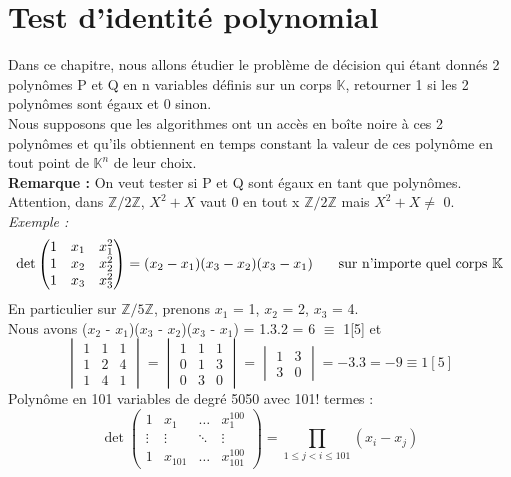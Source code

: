\documentclass[12pt,a4paper]{article}
\newcommand\tab[1][0.65cm]{\hspace*{#1}}
\begin{document}
\section{Test d'identité polynomial}
Dans ce chapitre, nous allons étudier le problème de décision qui étant donnés 2 polynômes P et Q en n variables définis sur un corps $\mathbb{K}$, retourner 1 si les 2 polynômes sont égaux et 0 sinon.\\
Nous supposons que les algorithmes ont un accès en boîte noire à ces 2 polynômes et qu'ils obtiennent en temps constant la valeur de ces polynôme en tout point de $\mathbb{K}^n$ de leur choix.\\
\textbf{Remarque :} On veut tester si P et Q sont égaux en tant que polynômes. Attention, dans $\mathbb{Z}/2\mathbb{Z}$, $X^2+ X$ vaut 0 en tout x $\mathbb{Z}/2\mathbb{Z}$ mais $X^2 + X \neq$ 0.\\
\textit{Exemple :}\\
\begin{equation*}
\det
\begin{pmatrix}
1 & x_1 & x^2_1 \\
1 & x_2 & x_2^2 \\
1 & x_3 & x^2_3
\end{pmatrix} = (x_2 - x_1)(x_3 - x_2)(x_3 - x_1) \text{\tab sur n'importe quel corps $\mathbb{K}$}
\end{equation*}
En particulier sur $\mathbb{Z}/5\mathbb{Z}$, prenons $x_1$ = 1, $x_2$ = 2, $x_3$ = 4.\\
Nous avons ($x_2$ - $x_1$)($x_3$ - $x_2$)($x_3$ - $x_1$) = 1.3.2 = 6 $\equiv$ 1[5] et
\begin{equation*}
\begin{vmatrix}
1 & 1 & 1 \\
1 & 2 & 4 \\
1 & 4 & 1
\end{vmatrix} =
\begin{vmatrix}
1 & 1 & 1 \\
0 & 1 & 3 \\
0 & 3 & 0
\end{vmatrix} =
\begin{vmatrix}
1 & 3 \\
3 & 0
\end{vmatrix} = -3.3 = -9 \equiv 1[5]
\end{equation*}
Polynôme en 101 variables de degré 5050 avec 101! termes :
\begin{equation*}
\det
\begin{pmatrix}
1 & x_1 & \dots & x^{100}_1 \\
\vdots & \vdots & \ddots & \vdots \\
1 & x_{101} & \dots & x^{100}_{101}
\end{pmatrix} = \prod\limits_{1 \leq j < i \leq 101} (x_i - x_j)
\end{equation*}
\end{document}
